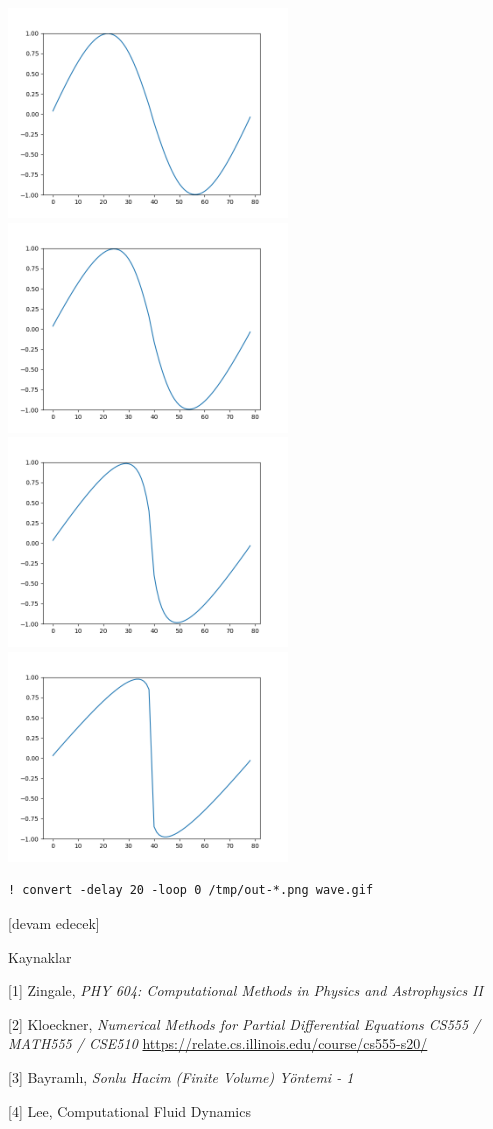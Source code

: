 \documentclass[12pt,fleqn]{article}\usepackage{../../common}
\begin{document}
\includegraphics[width=20em]{out-005.png}
\includegraphics[width=20em]{out-010.png}
\includegraphics[width=20em]{out-020.png}
\includegraphics[width=20em]{out-030.png}

\begin{verbatim}
! convert -delay 20 -loop 0 /tmp/out-*.png wave.gif
\end{verbatim}

[devam edecek]
  
Kaynaklar

[1] Zingale, {\em PHY 604: Computational Methods in Physics and Astrophysics II}

[2] Kloeckner, {\em Numerical Methods for Partial Differential Equations CS555 / MATH555 / CSE510}
    \url{https://relate.cs.illinois.edu/course/cs555-s20/}

[3] Bayramlı, {\em Sonlu Hacim (Finite Volume) Yöntemi - 1}

[4] Lee, Computational Fluid Dynamics
\end{document}
